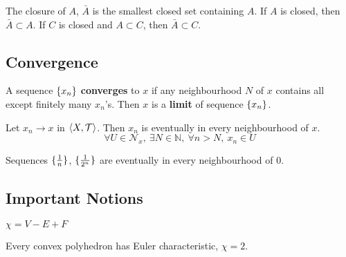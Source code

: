 \begin{note}
	The closure of $A$, $\bar{A}$ is the smallest closed set containing $A$.
	If $A$ is closed, then $\bar{A} \subset A$.
	If $C$ is closed and $A \subset C$, then $\bar{A} \subset C$.
\end{note}

\subsection{Convergence}
\begin{definition}[neighbourhood]
	A sequence $\{x_n\}$ \textbf{converges} to $x$ if any neighbourhood $N$ of $x$ contains all except finitely many $x_n$'s.
	Then $x$ is a \textbf{limit} of sequence $\{x_n\}$.
\end{definition}
\begin{note}
	Let $x_n \to x$ in $\left\langle X,\mathcal{T} \right\rangle$.
	Then $x_n$ is eventually in every neighbourhood of $x$.
	\begin{equation}
		\forall U \in \mathcal{N}_x,\ \exists N \in \mathbb{N},\ \forall n > N,\ x_n \in U
	\end{equation}
\end{note}

\begin{note}
	Sequences $\{\frac{1}{n}\}$, $\{\frac{1}{2^n}\}$ are eventually in every neighbourhood of $0$.
\end{note}


\subsection{Important Notions}

\begin{definition}
	$\chi = V - E + F$
\end{definition}
\begin{remark}
	Every convex polyhedron has Euler characteristic, $\chi = 2$.
\end{remark}
